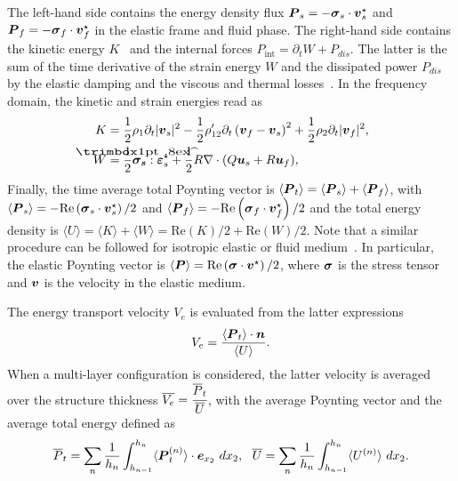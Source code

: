 The left-hand side contains the energy density flux $\boldsymbol P_s=-  \boldsymbol \sigma_s \cdot \boldsymbol v_s^\star$ and $\boldsymbol P_f=-  \boldsymbol \sigma_f \cdot \boldsymbol v_f^\star$ in the elastic frame and fluid phase. The right-hand side contains the kinetic energy $K$~\cite{allard2009} and the internal forces $P_{\text{int}}=\partial_t W+P_{dis}$. The latter is the sum of the time derivative of the strain energy $W$ and the dissipated power $P_{dis}$ by the elastic damping and the viscous and thermal losses~\cite{dazel2008}. In the frequency domain, the kinetic and strain energies read as
   \begin{equation}
        \begin{aligned}
            K &= \frac 1 2 \rho_1  \partial_t |\mbf v_s|^2 - \frac 1 2 \rho_{12}' \partial_t\left(\mbf v_f - \mbf v_s \right)^2 +  \frac 1 2\rho_2 \partial_t|\mbf v_f|^2, \\
            W &= \frac 1 2 \mbf{\hat \sigma_s}: \mbf \varepsilon_s^\star + \frac 1 2 R \nabla \cdot ( Q  \mbf u_s + R \mbf u_f ),
        \end{aligned}
    \end{equation}
Finally, the time average total Poynting vector is $\langle \boldsymbol P_t \rangle=\langle \boldsymbol P_s \rangle+\langle \boldsymbol P_f\rangle$, with $\langle \boldsymbol P_s \rangle=-  \textrm{Re}\left(\boldsymbol \sigma_s \cdot \boldsymbol v_s^\star\right)/2 $ and $\langle \boldsymbol P_f\rangle =-  \textrm{Re}\left(\boldsymbol \sigma_f \cdot \boldsymbol v_f^\star \right)/2$ and the total energy density is $\langle U \rangle = \langle K \rangle+\langle W \rangle =  \text{Re}(K)/2 + \text{Re} (W)/2$. Note that a similar procedure can be followed for isotropic elastic or fluid medium~\cite{royer2021}. In particular, the elastic Poynting vector is $\langle \boldsymbol P \rangle=\textrm{Re}\left(\boldsymbol \sigma \cdot \boldsymbol v^\star\right)/2$, where $\boldsymbol \sigma$ is the stress tensor and $\boldsymbol v$ is the velocity in the elastic medium. 

The energy transport velocity $V_e$ is evaluated from the latter expressions
\begin{equation}
    V_e = \frac{\langle \boldsymbol P_t \rangle \cdot \boldsymbol n}{ \langle U \rangle}.
\end{equation}
When a multi-layer configuration is considered, the latter velocity is averaged over the structure thickness $\overline{V_e} = \cfrac {\overline{P}_t} {\overline U}$, with the average Poynting vector and the average total energy defined as
\begin{equation}
    \overline{P}_t = \sum_n \frac{1}{h_n} \int_{h_{n-1}}^{h_n} \langle\boldsymbol P_t^{(n)} \rangle\cdot \boldsymbol e_{x_2} ~dx_2, ~~
    \overline U = \sum_n \frac{1}{h_n} \int_{h_{n-1}}^{h_n} \langle U^{(n)} \rangle  ~dx_2.
    \label{eq:mean_energy}
\end{equation}

